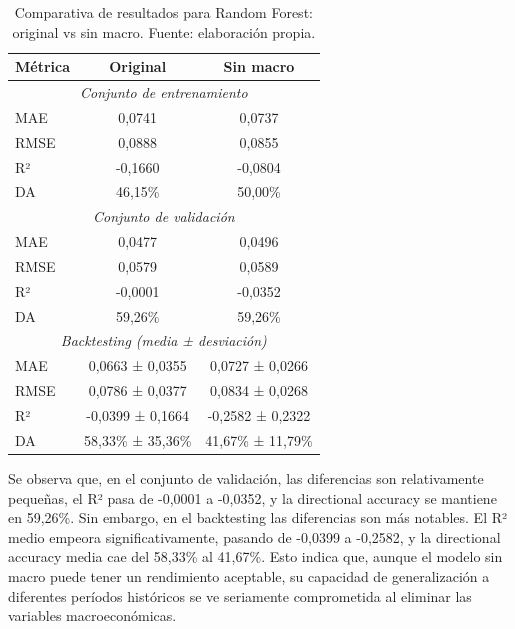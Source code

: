 \begin{enumerate}
\begin{itemize}
        \begin{table}[H]
        \centering
        \begin{tabular}{|l|c|c|}
        \hline
        \textbf{Métrica} & \textbf{Original} & \textbf{Sin macro} \\
        \hline
        \multicolumn{3}{|c|}{\textit{Conjunto de entrenamiento}} \\
        \hline
        MAE & 0,0741 & 0,0737 \\
        RMSE & 0,0888 & 0,0855 \\
        R² & -0,1660 & -0,0804 \\
        DA & 46,15\% & 50,00\% \\
        \hline
        \multicolumn{3}{|c|}{\textit{Conjunto de validación}} \\
        \hline
        MAE & 0,0477 & 0,0496 \\
        RMSE & 0,0579 & 0,0589 \\
        R² & -0,0001 & -0,0352 \\
        DA & 59,26\% & 59,26\% \\
        \hline
        \multicolumn{3}{|c|}{\textit{Backtesting (media ± desviación)}} \\
        \hline
        MAE & 0,0663 ± 0,0355 & 0,0727 ± 0,0266 \\
        RMSE & 0,0786 ± 0,0377 & 0,0834 ± 0,0268 \\
        R² & -0,0399 ± 0,1664 & -0,2582 ± 0,2322 \\
        DA & 58,33\% ± 35,36\% & 41,67\% ± 11,79\% \\
        \hline
        \end{tabular}
        \label{tab:experimento_rf}
        \caption{Comparativa de resultados para Random Forest: original vs sin macro. Fuente: elaboración propia.}
        \end{table}

        Se observa que, en el conjunto de validación, las diferencias son relativamente pequeñas, el R² pasa de -0,0001 a -0,0352, y la directional accuracy se mantiene en 59,26\%. Sin embargo, en el backtesting las diferencias son más notables. El R² medio empeora significativamente, pasando de -0,0399 a -0,2582, y la directional accuracy media cae del 58,33\% al 41,67\%. Esto indica que, aunque el modelo sin macro puede tener un rendimiento aceptable, su capacidad de generalización a diferentes períodos históricos se ve seriamente comprometida al eliminar las variables macroeconómicas.


\end{itemize}
\end{enumerate}

